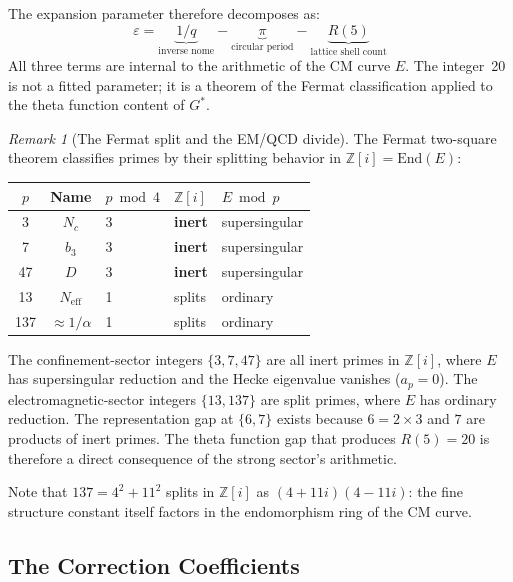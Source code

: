 \documentclass[11pt,twoside]{article}
\theoremstyle{remark}
\newtheorem{remark}{Remark}
\newcommand{\eps}{\varepsilon}
\begin{document}
\noindent The expansion parameter therefore decomposes as:
\begin{equation}
    \eps = \underbrace{1/q}_{\text{inverse nome}} - \underbrace{\pi}_{\text{circular period}} - \underbrace{R(5)}_{\text{lattice shell count}}
\end{equation}
All three terms are internal to the arithmetic of the CM curve $E$. The integer~20 is not a fitted parameter; it is a theorem of the Fermat classification applied to the theta function content of $G^*$.

\begin{remark}[The Fermat split and the EM/QCD divide]
\label{rmk:fermat}
The Fermat two-square theorem classifies primes by their splitting behavior in $\mathbb{Z}[i] = \mathrm{End}(E)$:
\begin{center}
\renewcommand{\arraystretch}{1.2}
\begin{tabular}{@{}cclll@{}}
\toprule
$p$ & Name & $p \bmod 4$ & $\mathbb{Z}[i]$ & $E \bmod p$ \\
\midrule
3  & $N_c$    & 3 & \textbf{inert}  & supersingular \\
7  & $b_3$    & 3 & \textbf{inert}  & supersingular \\
47 & $D$      & 3 & \textbf{inert}  & supersingular \\
\midrule
13 & $N_{\mathrm{eff}}$ & 1 & splits & ordinary \\
137 & $\approx 1/\alpha$ & 1 & splits & ordinary \\
\bottomrule
\end{tabular}
\end{center}
The confinement-sector integers $\{3, 7, 47\}$ are all inert primes in $\mathbb{Z}[i]$, where $E$ has supersingular reduction and the Hecke eigenvalue vanishes ($a_p = 0$). The electromagnetic-sector integers $\{13, 137\}$ are split primes, where $E$ has ordinary reduction. The representation gap at $\{6, 7\}$ exists because $6 = 2 \times 3$ and $7$ are products of inert primes. The theta function gap that produces $R(5) = 20$ is therefore a direct consequence of the strong sector's arithmetic.

Note that $137 = 4^2 + 11^2$ splits in $\mathbb{Z}[i]$ as $(4 + 11i)(4 - 11i)$: the fine structure constant itself factors in the endomorphism ring of the CM curve.
\end{remark}


\subsection{The Correction Coefficients}
\label{sec:coefficients}
\end{document}
